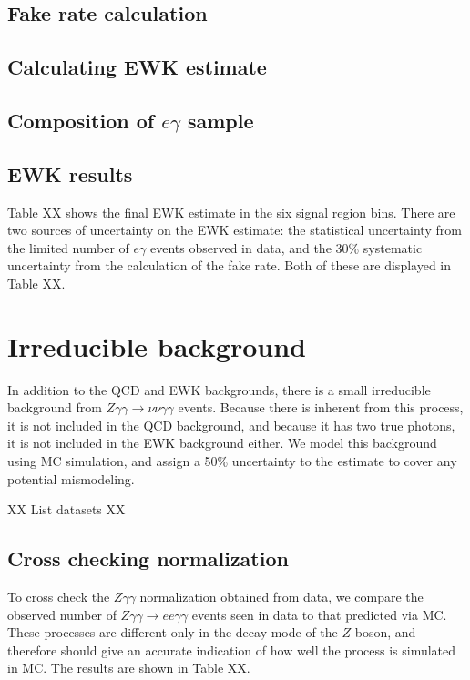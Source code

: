 \subsection{Fake rate calculation}
\label{sec:fakeRate}

\subsection{Calculating EWK estimate}

\subsection{Composition of $e\gamma$ sample}

\subsection{EWK results}
\label{sec:EWKresults}

Table XX shows the final EWK estimate in the six signal region bins. There are two sources of uncertainty on the EWK estimate: the statistical uncertainty from the limited number of $e\gamma$ events observed in data, and the 30\% systematic uncertainty from the calculation of the fake rate. Both of these are displayed in Table XX.


\section{Irreducible background}
\label{sec:Zgg}

In addition to the QCD and EWK backgrounds, there is a small irreducible background from $Z\gamma\gamma\rightarrow\nu\nu\gamma\gamma$ events. Because there is inherent \ETmiss from this process, it is not included in the QCD background, and because it has two true photons, it is not included in the EWK background either. We model this background using MC simulation, and assign a 50\% uncertainty to the estimate to cover any potential mismodeling. 

XX List datasets XX

\subsection{Cross checking normalization}
\label{sec:ZggNorm}
To cross check the $Z\gamma\gamma$ normalization obtained from data, we compare the observed number of $Z\gamma\gamma\rightarrow ee \gamma\gamma$ events seen in data to that predicted via MC. These processes are different only in the decay mode of the $Z$ boson, and therefore should give an accurate indication of how well the process is simulated in MC. The results are shown in Table XX. 



%
